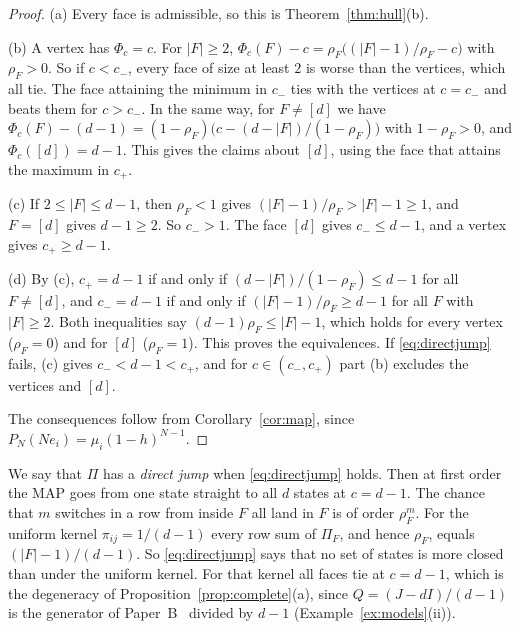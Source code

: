 \begin{proof}
(a) Every face is admissible, so this is Theorem~\ref{thm:hull}(b).

(b) A vertex has $\Phi_c=c$. For $\lvert F\rvert\ge2$,
$\Phi_c(F)-c=\rho_F\bigl((\lvert F\rvert-1)/\rho_F-c\bigr)$ with
$\rho_F>0$. So if $c<c_-$, every face of size at least $2$ is worse than the
vertices, which all tie. The face attaining the minimum in $c_-$ ties with
the vertices at $c=c_-$ and beats them for $c>c_-$. In the same way, for
$F\ne[d]$ we have $\Phi_c(F)-(d-1)=(1-\rho_F)\bigl(c-(d-\lvert F\rvert)/
(1-\rho_F)\bigr)$ with $1-\rho_F>0$, and $\Phi_c([d])=d-1$. This gives the
claims about $[d]$, using the face that attains the maximum in $c_+$.

(c) If $2\le\lvert F\rvert\le d-1$, then $\rho_F<1$ gives
$(\lvert F\rvert-1)/\rho_F>\lvert F\rvert-1\ge1$, and $F=[d]$ gives
$d-1\ge2$. So $c_->1$. The face $[d]$ gives $c_-\le d-1$, and a vertex gives
$c_+\ge d-1$.

(d) By (c), $c_+=d-1$ if and only if $(d-\lvert F\rvert)/(1-\rho_F)\le d-1$
for all $F\ne[d]$, and $c_-=d-1$ if and only if
$(\lvert F\rvert-1)/\rho_F\ge d-1$ for all $F$ with $\lvert F\rvert\ge2$.
Both inequalities say $(d-1)\rho_F\le\lvert F\rvert-1$, which holds for
every vertex ($\rho_F=0$) and for $[d]$ ($\rho_F=1$). This proves the
equivalences. If \eqref{eq:directjump} fails, (c) gives $c_-<d-1<c_+$, and
for $c\in(c_-,c_+)$ part (b) excludes the vertices and $[d]$.

The consequences follow from Corollary~\ref{cor:map}, since
$P_N(Ne_i)=\mu_i(1-h)^{N-1}$.
\end{proof}

We say that $\Pi$ has a \emph{direct jump} when \eqref{eq:directjump} holds.
Then at first order the MAP goes from one state straight to all $d$ states
at $c=d-1$. The chance that $m$ switches in a row from inside $F$ all land in
$F$ is of order $\rho_F^m$. For the uniform kernel
$\pi_{ij}=1/(d-1)$ every row sum of $\Pi_F$, and hence $\rho_F$, equals
$(\lvert F\rvert-1)/(d-1)$. So \eqref{eq:directjump} says that no set of
states is more closed than under the uniform kernel. For that kernel all
faces tie at $c=d-1$, which is the degeneracy of
Proposition~\ref{prop:complete}(a), since $Q=(J-dI)/(d-1)$ is the generator
of Paper~B~\cite{paperB} divided by $d-1$ (Example~\ref{ex:models}(ii)).

